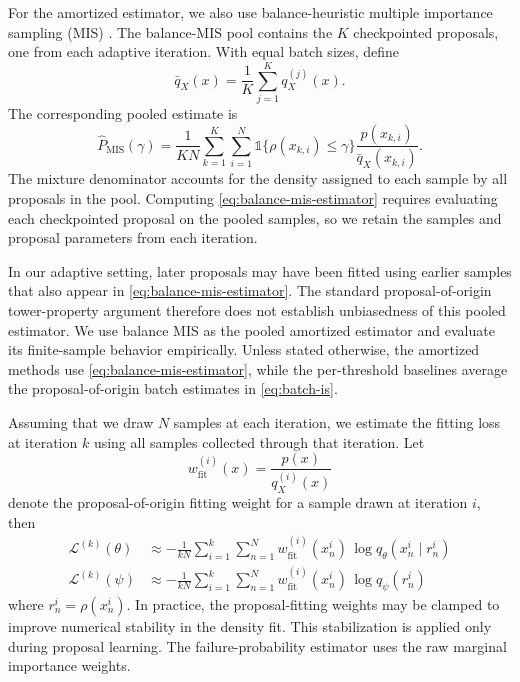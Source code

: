 \documentclass[twoside,11pt]{article}
\begin{document}
For the amortized estimator, we also use balance-heuristic multiple importance sampling (MIS) \citep{veach1995optimally, elvira2019generalized}. The balance-MIS pool contains the $K$ checkpointed proposals, one from each adaptive iteration. With equal batch sizes, define
\begin{equation}
    \label{eq:balance-mixture}
    \bar{q}_X(x)
    =
    \frac{1}{K}
    \sum_{j=1}^{K}
    q_X^{(j)}(x).
\end{equation}
The corresponding pooled estimate is
\begin{equation}
    \label{eq:balance-mis-estimator}
    \hat{P}_{\mathrm{MIS}}(\gamma)
    =
    \frac{1}{KN}
    \sum_{k=1}^{K}
    \sum_{i=1}^{N}
    \mathds{1}\{\rho(x_{k,i})\leq\gamma\}
    \frac{p(x_{k,i})}{\bar{q}_X(x_{k,i})}.
\end{equation}
The mixture denominator accounts for the density assigned to each sample by all proposals in the pool. Computing \cref{eq:balance-mis-estimator} requires evaluating each checkpointed proposal on the pooled samples, so we retain the samples and proposal parameters from each iteration.

In our adaptive setting, later proposals may have been fitted using earlier samples that also appear in \cref{eq:balance-mis-estimator}. The standard proposal-of-origin tower-property argument therefore does not establish unbiasedness of this pooled estimator. We use balance MIS as the pooled amortized estimator and evaluate its finite-sample behavior empirically. Unless stated otherwise, the amortized methods use \cref{eq:balance-mis-estimator}, while the per-threshold baselines average the proposal-of-origin batch estimates in \cref{eq:batch-is}.

Assuming that we draw $N$ samples at each iteration, we estimate the fitting loss at iteration $k$ using all samples collected through that iteration. Let
\[
    w_{\mathrm{fit}}^{(i)}(x)
    =
    \frac{p(x)}{q_X^{(i)}(x)}
\]
denote the proposal-of-origin fitting weight for a sample drawn at iteration $i$, then
\begin{align}
    \label{eq:reused-fit-loss}
    \mathcal{L}^{(k)}(\theta)
    &\approx
    -\frac{1}{kN}
    \sum_{i=1}^k
    \sum_{n=1}^N
    w_{\mathrm{fit}}^{(i)}(x_n^i)\,
    \log q_{\theta}(x_n^i\mid r_n^i)
    \\
    \mathcal{L}^{(k)}(\psi)
    &\approx
    -\frac{1}{kN}
    \sum_{i=1}^k
    \sum_{n=1}^N
    w_{\mathrm{fit}}^{(i)}(x_n^i)\,
    \log q_{\psi}(r_n^i)
    \nonumber
\end{align}
where $r_n^i=\rho(x_n^i)$. In practice, the proposal-fitting weights may be clamped to improve numerical stability in the density fit. This stabilization is applied only during proposal learning. The failure-probability estimator uses the raw marginal importance weights.
\end{document}
